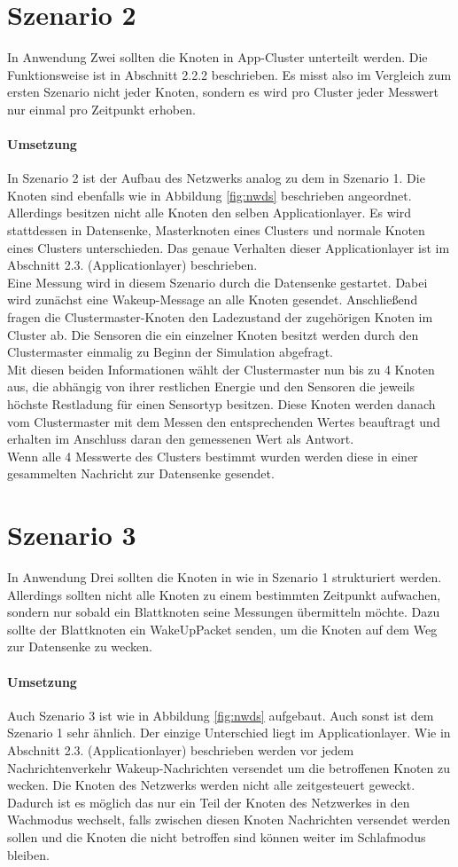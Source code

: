 \section{Szenario 2}
In Anwendung Zwei sollten die Knoten in App-Cluster unterteilt werden. Die Funktionsweise ist in Abschnitt 2.2.2 beschrieben. Es misst also im Vergleich zum ersten Szenario nicht jeder Knoten, sondern es wird pro Cluster jeder Messwert nur einmal pro Zeitpunkt erhoben.
\paragraph{Umsetzung}
In Szenario 2 ist der Aufbau des Netzwerks analog zu dem in Szenario 1. Die Knoten sind ebenfalls wie in Abbildung \ref{fig:nwds} beschrieben angeordnet. Allerdings besitzen nicht alle Knoten den selben Applicationlayer. Es wird stattdessen in Datensenke, Masterknoten eines Clusters und normale Knoten eines Clusters unterschieden. Das genaue Verhalten dieser Applicationlayer ist im Abschnitt 2.3. (Applicationlayer) beschrieben.\\
Eine Messung wird in diesem Szenario durch die Datensenke gestartet. Dabei wird zunächst eine Wakeup-Message an alle Knoten gesendet. Anschließend fragen die Clustermaster-Knoten den Ladezustand der zugehörigen Knoten im Cluster ab. Die Sensoren die ein einzelner Knoten besitzt werden durch den Clustermaster einmalig zu Beginn der Simulation abgefragt. \\
Mit diesen beiden Informationen wählt der Clustermaster nun bis zu 4 Knoten aus, die abhängig von ihrer restlichen Energie und den Sensoren die jeweils höchste Restladung für einen Sensortyp besitzen. Diese Knoten werden danach vom Clustermaster mit dem Messen den entsprechenden Wertes beauftragt und erhalten im Anschluss daran den gemessenen Wert als Antwort.\\
Wenn alle 4 Messwerte des Clusters bestimmt wurden werden diese in einer gesammelten Nachricht zur Datensenke gesendet.

\section{Szenario 3}
In Anwendung Drei sollten die Knoten in wie in Szenario 1 strukturiert werden. Allerdings sollten nicht alle Knoten zu einem bestimmten Zeitpunkt aufwachen, sondern nur sobald ein Blattknoten seine Messungen übermitteln möchte. Dazu sollte der Blattknoten ein WakeUpPacket senden, um die Knoten auf dem Weg zur Datensenke zu wecken.
\paragraph{Umsetzung}
Auch Szenario 3 ist wie in Abbildung \ref{fig:nwds} aufgebaut. Auch sonst ist dem Szenario 1 sehr ähnlich. Der einzige Unterschied liegt im Applicationlayer. Wie in Abschnitt 2.3. (Applicationlayer) beschrieben werden vor jedem Nachrichtenverkehr Wakeup-Nachrichten versendet um die betroffenen Knoten zu wecken. Die Knoten des Netzwerks werden nicht alle zeitgesteuert geweckt. Dadurch ist es möglich das nur ein Teil der Knoten des Netzwerkes in den Wachmodus wechselt, falls zwischen diesen Knoten Nachrichten versendet werden sollen und die Knoten die nicht betroffen sind können weiter im Schlafmodus bleiben.